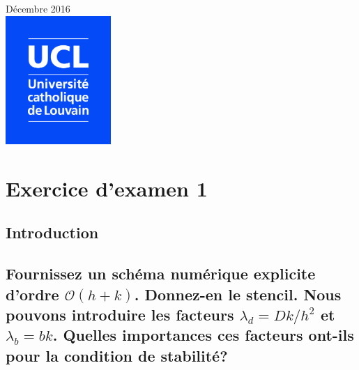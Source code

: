 \documentclass[a4paper, 12pt]{report}
\begin{document}
\begin{titlepage}


{\large Décembre 2016}\\[1.5cm] %


\includegraphics[width=4cm]{Logo_UCL_SCIENCES.jpg}\\[1cm] %


\vfill %

\end{titlepage}

\chapter{Exercice d'examen 1}

\section*{Introduction}


\section{Fournissez un schéma numérique explicite d'ordre $\mathcal{O}(h+k)$.
Donnez-en le stencil. Nous pouvons introduire les facteurs $\lambda_d = Dk/h^2$
et $\lambda_b = bk$. Quelles importances ces facteurs ont-ils pour la condition
de stabilité?}
\end{document}
